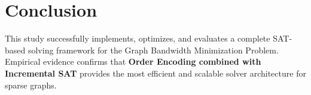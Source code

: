 
\section{Conclusion}
This study successfully implements, optimizes, and evaluates a complete SAT-based solving framework for the Graph Bandwidth Minimization Problem. Empirical evidence confirms that \textbf{Order Encoding combined with Incremental SAT} provides the most efficient and scalable solver architecture for sparse graphs.